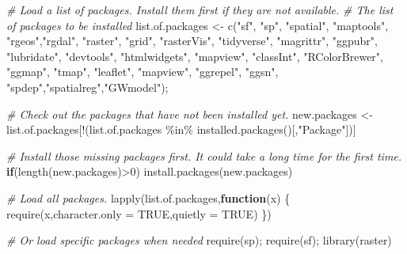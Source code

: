 \documentclass[
  11pt,
]{book}
\newenvironment{Shaded}{\begin{snugshade}}{\end{snugshade}}
\newcommand{\AttributeTok}[1]{\textcolor[rgb]{0.77,0.63,0.00}{#1}}
\newcommand{\CommentTok}[1]{\textcolor[rgb]{0.56,0.35,0.01}{\textit{#1}}}
\newcommand{\ConstantTok}[1]{\textcolor[rgb]{0.00,0.00,0.00}{#1}}
\newcommand{\ControlFlowTok}[1]{\textcolor[rgb]{0.13,0.29,0.53}{\textbf{#1}}}
\newcommand{\DecValTok}[1]{\textcolor[rgb]{0.00,0.00,0.81}{#1}}
\newcommand{\FunctionTok}[1]{\textcolor[rgb]{0.00,0.00,0.00}{#1}}
\newcommand{\NormalTok}[1]{#1}
\newcommand{\OtherTok}[1]{\textcolor[rgb]{0.56,0.35,0.01}{#1}}
\newcommand{\SpecialCharTok}[1]{\textcolor[rgb]{0.00,0.00,0.00}{#1}}
\newcommand{\StringTok}[1]{\textcolor[rgb]{0.31,0.60,0.02}{#1}}
\begin{document}
\begin{Shaded}
\begin{Highlighting}[]
\CommentTok{\# Load a list of packages. Install them first if they are not available.}
\CommentTok{\# The list of packages to be installed}
\NormalTok{list.of.packages }\OtherTok{\textless{}{-}} \FunctionTok{c}\NormalTok{(}\StringTok{"sf"}\NormalTok{, }\StringTok{"sp"}\NormalTok{, }\StringTok{"spatial"}\NormalTok{, }\StringTok{"maptools"}\NormalTok{, }\StringTok{"rgeos"}\NormalTok{,}\StringTok{"rgdal"}\NormalTok{,}
                      \StringTok{"raster"}\NormalTok{, }\StringTok{"grid"}\NormalTok{, }\StringTok{"rasterVis"}\NormalTok{,}
                      \StringTok{"tidyverse"}\NormalTok{, }\StringTok{"magrittr"}\NormalTok{, }\StringTok{"ggpubr"}\NormalTok{, }\StringTok{"lubridate"}\NormalTok{,}
                      \StringTok{"devtools"}\NormalTok{, }\StringTok{"htmlwidgets"}\NormalTok{, }\StringTok{"mapview"}\NormalTok{,}
                      \StringTok{"classInt"}\NormalTok{, }\StringTok{"RColorBrewer"}\NormalTok{, }\StringTok{"ggmap"}\NormalTok{, }\StringTok{"tmap"}\NormalTok{, }\StringTok{"leaflet"}\NormalTok{, }\StringTok{"mapview"}\NormalTok{, }
                      \StringTok{"ggrepel"}\NormalTok{, }\StringTok{"ggsn"}\NormalTok{,}
                      \StringTok{"spdep"}\NormalTok{,}\StringTok{"spatialreg"}\NormalTok{,}\StringTok{"GWmodel"}\NormalTok{);}

\CommentTok{\# Check out the packages that have not been installed yet.}
\NormalTok{new.packages }\OtherTok{\textless{}{-}}\NormalTok{ list.of.packages[}\SpecialCharTok{!}\NormalTok{(list.of.packages }\SpecialCharTok{\%in\%} \FunctionTok{installed.packages}\NormalTok{()[,}\StringTok{"Package"}\NormalTok{])]}

\CommentTok{\# Install those missing packages first. It could take a long time for the first time.}
\ControlFlowTok{if}\NormalTok{(}\FunctionTok{length}\NormalTok{(new.packages)}\SpecialCharTok{\textgreater{}}\DecValTok{0}\NormalTok{) }\FunctionTok{install.packages}\NormalTok{(new.packages)}

\CommentTok{\# Load all packages.}
\FunctionTok{lapply}\NormalTok{(list.of.packages,}\ControlFlowTok{function}\NormalTok{(x) \{}
  \FunctionTok{require}\NormalTok{(x,}\AttributeTok{character.only =} \ConstantTok{TRUE}\NormalTok{,}\AttributeTok{quietly =} \ConstantTok{TRUE}\NormalTok{)}
\NormalTok{\})}

\CommentTok{\# Or load specific packages when needed}
\FunctionTok{require}\NormalTok{(sp); }\FunctionTok{require}\NormalTok{(sf); }\FunctionTok{library}\NormalTok{(raster)}
\end{Highlighting}
\end{Shaded}
\end{document}
